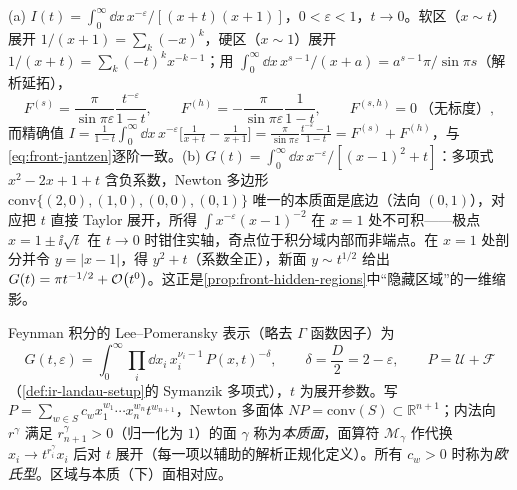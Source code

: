 \begin{example}[两个一维玩具模型]\label{ex:front-regions-toys}
(a) $I(t)=\int_0^\infty\dd x\,x^{-\varepsilon}/[(x+t)(x+1)]$，$0<\varepsilon<1$，$t\to0$。软区（$x\sim t$）展开 $1/(x+1)=\sum_k(-x)^k$，硬区（$x\sim1$）展开 $1/(x+t)=\sum_k(-t)^kx^{-k-1}$；用 $\int_0^\infty\dd x\,x^{s-1}/(x+a)=a^{s-1}\pi/\sin\pi s$（解析延拓），
\begin{equation*}
F^{(s)}=\frac{\pi}{\sin\pi\varepsilon}\frac{t^{-\varepsilon}}{1-t},\qquad F^{(h)}=-\frac{\pi}{\sin\pi\varepsilon}\frac{1}{1-t},\qquad F^{(s,h)}=0\ \text{（无标度）},
\end{equation*}
而精确值 $I=\frac{1}{1-t}\int_0^\infty\dd x\,x^{-\varepsilon}\bigl[\frac1{x+t}-\frac1{x+1}\bigr]=\frac{\pi}{\sin\pi\varepsilon}\frac{t^{-\varepsilon}-1}{1-t}=F^{(s)}+F^{(h)}$，与\cref{eq:front-jantzen}逐阶一致。(b) $G(t)=\int_0^\infty\dd x\,x^{-\varepsilon}/[(x-1)^2+t]$：多项式 $x^2-2x+1+t$ 含负系数，Newton 多边形 $\mathrm{conv}\{(2,0),(1,0),(0,0),(0,1)\}$ 唯一的本质面是底边（法向 $(0,1)$），对应把 $t$ 直接 Taylor 展开，所得 $\int x^{-\varepsilon}(x-1)^{-2}$ 在 $x=1$ 处不可积——极点 $x=1\pm\ii\sqrt t$ 在 $t\to0$ 时钳住实轴，奇点位于积分域内部而非端点。在 $x=1$ 处剖分并令 $y=|x-1|$，得 $y^2+t$（系数全正），新面 $y\sim t^{1/2}$ 给出 $G(t)=\pi t^{-1/2}+\mathcal{O}\!\left(t^0\right)$。这正是\cref{prop:front-hidden-regions}中“隐藏区域”的一维缩影。
\end{example}

\begin{definition}\label{def:front-facets}
Feynman 积分的 Lee--Pomeransky 表示（略去 $\Gamma$ 函数因子）为
\begin{equation*}
G(t,\varepsilon)=\int_0^\infty\prod_i\dd x_i\,x_i^{\nu_i-1}\,P(x,t)^{-\delta},\qquad\delta=\frac D2=2-\varepsilon,\qquad P=\mathcal U+\mathcal F
\end{equation*}
（\cref{def:ir-landau-setup}的 Symanzik 多项式），$t$ 为展开参数。写 $P=\sum_{w\in S}c_wx_1^{w_1}\cdots x_n^{w_n}t^{w_{n+1}}$，Newton 多面体 $NP=\mathrm{conv}(S)\subset\mathbb R^{n+1}$；内法向 $r^\gamma$ 满足 $r^\gamma_{n+1}>0$（归一化为 $1$）的面 $\gamma$ 称为\emph{本质面}，面算符 $\mathcal M_\gamma$ 作代换 $x_i\to t^{r^\gamma_i}x_i$ 后对 $t$ 展开（每一项以辅助的解析正规化定义）。所有 $c_w>0$ 时称为\emph{欧氏型}。区域与本质（下）面相对应。
\end{definition}

